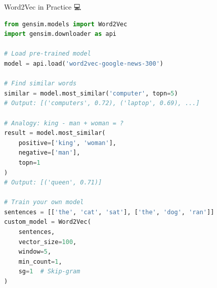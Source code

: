 \documentclass[aspectratio=169]{beamer}
\begin{document}
\begin{frame}[fragile]{Word2Vec in Practice 💻}
\begin{lstlisting}[language=Python]
from gensim.models import Word2Vec
import gensim.downloader as api

# Load pre-trained model
model = api.load('word2vec-google-news-300')

# Find similar words
similar = model.most_similar('computer', topn=5)
# Output: [('computers', 0.72), ('laptop', 0.69), ...]

# Analogy: king - man + woman = ?
result = model.most_similar(
    positive=['king', 'woman'],
    negative=['man'],
    topn=1
)
# Output: [('queen', 0.71)]

# Train your own model
sentences = [['the', 'cat', 'sat'], ['the', 'dog', 'ran']]
custom_model = Word2Vec(
    sentences,
    vector_size=100,
    window=5,
    min_count=1,
    sg=1  # Skip-gram
)
\end{lstlisting}
\end{frame}
\end{document}
